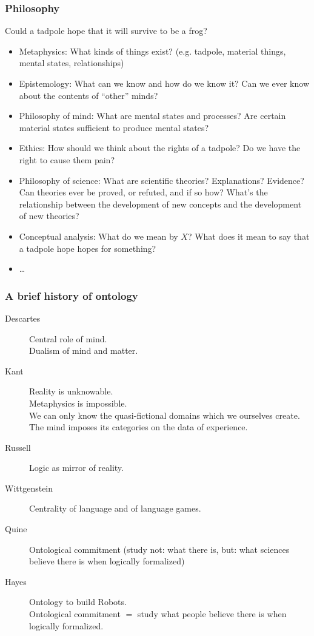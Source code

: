 \documentclass[UTF8,11pt,colorlinks,compress,openany]{beamer}%
\begin{document}
\begin{frame}\frametitle{Philosophy}
\begin{center}
Could a tadpole hope that it will survive to be a frog?
\end{center}
\begin{itemize}
	\item Metaphysics: What kinds of things exist? (e.g. tadpole, material things, mental states, relationships)
	\item Epistemology: What can we know and how do we know it? Can we ever know about the contents of ``other'' minds?
	\item Philosophy of mind: What are mental states and processes? Are certain material states sufficient to produce mental states?
	\item Ethics: How should we think about the rights of a tadpole? Do we have the right to cause them pain?
	\item Philosophy of science: What are scientific theories? Explanations? Evidence? Can theories ever be proved, or refuted, and if so how? What's the relationship between the development of new concepts and the development of new theories?
	\item Conceptual analysis: What do we mean by $X$? What does it mean to say that a tadpole hope hopes for something?
	\item \dots
\end{itemize}
\end{frame}

\begin{frame}\frametitle{A brief history of ontology}
\begin{description}
	\item[Descartes] Central role of mind.\\
	Dualism of mind and matter.
	\item[Kant] Reality is unknowable.\\
	Metaphysics is impossible.\\
	We can only know the quasi-fictional domains which we ourselves create.\\
	The mind imposes its categories on the data of experience.
	\item[Russell] Logic as mirror of reality.
	\item[Wittgenstein] Centrality of language and of language games.
	\item[Quine] Ontological commitment (study not: what there is, but: what sciences believe there is when logically formalized)
	\item[Hayes] Ontology to build Robots.\\
	Ontological commitment $=$ study what people believe there is when logically formalized.
\end{description}
\end{frame}
\end{document}
